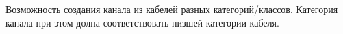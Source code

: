 Возможность создания канала из кабелей разных категорий/классов.
Категория канала при этом долна соответствовать низшей категории кабеля.